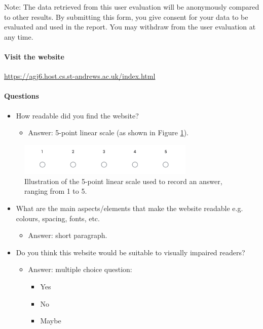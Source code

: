 \documentclass[letterpaper,12pt]{article}
\begin{document}
\begin{appendices}
Note: The data retrieved from this user evaluation will be anonymously compared to other results. By submitting this form, you give consent for your data to be evaluated and used in the report. You may withdraw from the user evaluation at any time.

\paragraph{Visit the website} \url{https://agj6.host.cs.st-andrews.ac.uk/index.html}

\paragraph{Questions}

\begin{itemize}
    \item How readable did you find the website?
    \begin{itemize}
        \item Answer: 5-point linear scale (as shown in Figure \ref{fig:linear-scale}).
    \end{itemize}
\end{itemize}

\begin{figure}[h] 
\centerline{\includegraphics[width=0.75\textwidth]{report/images/linear_scale.png}}
\caption{\label{fig:linear-scale}Illustration of the 5-point linear scale used to record an answer, ranging from 1 to 5.}
\end{figure}

\begin{itemize}
    \item What are the main aspects/elements that make the website readable e.g. colours, spacing, fonts, etc.
    \begin{itemize}
        \item Answer: short paragraph.
    \end{itemize}
\end{itemize}

\begin{itemize}
    \item Do you think this website would be suitable to visually impaired readers?
    \begin{itemize}
        \item Answer: multiple choice question:
        \begin{itemize}
            \item Yes
            \item No
            \item Maybe
        \end{itemize}
    \end{itemize}
\end{itemize}


\end{appendices}
\end{document}
